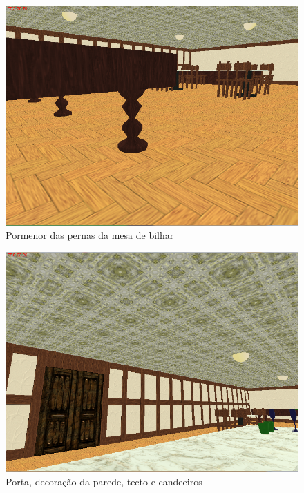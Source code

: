 \documentclass[a5paper,onecolumn, 11pt]{article}
\begin{document}
\begin{figure}[!htb]
    \centering
    \includegraphics[scale=0.5]{bar5.png}
    \caption{Pormenor das pernas da mesa de bilhar}
\end{figure}
\begin{figure}[!htb]
    \centering
    \includegraphics[scale=0.5]{bar6.png}
    \caption{Porta, decoração da parede, tecto e candeeiros }
\end{figure}
\end{document}
